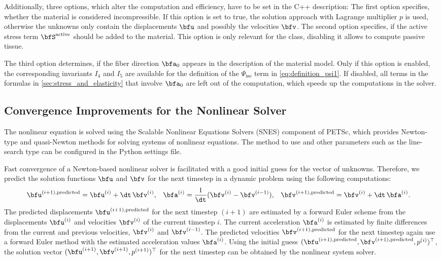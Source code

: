 Additionally, three options, which alter the computation and efficiency, have to be set in the C++ description: The first option specifies, whether the material is considered incompressible. If this option is set to true, the solution approach with Lagrange multiplier $p$ is used, otherwise the unknowns only contain the displacements $\bfu$ and possibly the velocities $\bfv$. The second option specifies, if the active stress term $\bfS^\text{active}$ should be added to the material. This option is only relevant for the  class, disabling it allows to compute passive tissue.

The third option determines, if the fiber direction $\bfa_0$ appears in the description of the material model. Only if this option is enabled, the corresponding invariants $I_4$ and $I_5$ are available for the definition of the $\Psi_\text{iso}$ term in \cref{eq:definition_psi1}. If disabled, all terms in the formulas in \cref{sec:stress_and_elasticity} that involve $\bfa_0$ are left out of the computation, which speeds up the computations in the solver.

\subsection{Convergence Improvements for the Nonlinear Solver}\label{sec:convergence_improvements_for_the_nonlinear_solver}

The nonlinear equation is solved using the Scalable Nonlinear Equations Solvers (SNES) component of PETSc, which provides Newton-type and quasi-Newton methods for solving systems of nonlinear equations. The method to use and other parameters such as the line-search type can be configured in the Python settings file.

Fast convergence of a Newton-based nonlinear solver is facilitated with a good initial guess for the vector of unknowns. Therefore, we predict the solution functions $\bfu$ and $\bfv$ for the next timestep in a dynamic problem using the following computations:
\begin{align*}
  \bfu^{(i+1),\text{predicted}} &= \bfu^{(i)} + \dt\,\bfv^{(i)}, & 
  \bfa^{(i)} &= \dfrac1{\dt}(\bfv^{(i)} - \bfv^{(i-1)}), & 
  \bfv^{(i+1),\text{predicted}} &= \bfv^{(i)} + \dt\,\bfa^{(i)}.
\end{align*}
%
The predicted displacements $\bfu^{(i+1),\text{predicted}}$ for the next timestep $(i+1)$ are estimated by a forward Euler scheme from the displacements $\bfu^{(i)}$ and velocities $\bfv^{(i)}$ of the current timestep $i$. The current acceleration $\bfa^{(i)}$ is estimated by finite differences from the current and previous velocities, $\bfv^{(i)}$ and $\bfv^{(i-1)}$. The predicted velocities $\bfv^{(i+1),\text{predicted}}$ for the next timestep again use a forward Euler method with the estimated acceleration values $\bfa^{(i)}$.
Using the initial guess $(\bfu^{(i+1),\text{predicted}},\bfv^{(i+1),\text{predicted}},p^{(i)})^\top$, the solution vector $(\bfu^{(i+1)},\bfv^{(i+1)},p^{(i+1)})^\top$  for the next timestep can be obtained by the nonlinear system solver.

